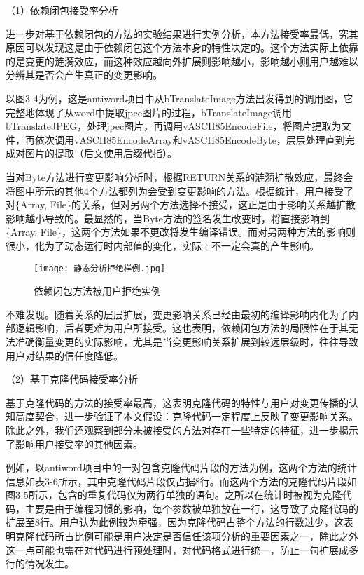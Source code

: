 （1）依赖闭包接受率分析

进一步对基于依赖闭包的方法的实验结果进行实例分析，本方法接受率最低，究其原因可以发现这是由于依赖闭包这个方法本身的特性决定的。这个方法实际上依靠的是变更的涟漪效应，而这种效应越向外扩展则影响越小，影响越小则用户越难以分辨其是否会产生真正的变更影响。

以图3-4为例，这是antiword项目中从bTranslateImage方法出发得到的调用图，它完整地体现了从word中提取jpec图片的过程，bTranslateImage调用bTranslateJPEG，处理jpec图片，再调用vASCII85EncodeFile，将图片提取为文件，再依次调用vASCII85EncodeArray和vASCII85EncodeByte，层层处理直到完成对图片的提取（后文使用后缀代指）。

当对Byte方法进行变更影响分析时，根据RETURN关系的涟漪扩散效应，最终会将图中所示的其他4个方法都列为会受到变更影响的方法。根据统计，用户接受了对\{Array, File\}的关系，但对另两个方法选择不接受，这正是由于影响关系越扩散影响越小导致的。最显然的，当Byte方法的签名发生改变时，将直接影响到\{Array, File\}，这两个方法如果不更改将发生编译错误。而对另两种方法的影响则很小，化为了动态运行时内部值的变化，实际上不一定会真的产生影响。

\clearpage

\begin{figure}[h]
\centering
\texttt{[image: 静态分析拒绝样例.jpg]}
\caption{依赖闭包方法被用户拒绝实例}
\end{figure}

不难发现。随着关系的层层扩展，变更影响关系已经由最初的编译影响内化为了内部逻辑影响，后者更难为用户所接受。这也表明，依赖闭包方法的局限性在于其无法准确衡量变更的实际影响，尤其是当变更影响关系扩展到较远层级时，往往导致用户对结果的信任度降低。



（2）基于克隆代码接受率分析

基于克隆代码的方法的接受率最高，这表明克隆代码的特性与用户对变更传播的认知高度契合，进一步验证了本文假设：克隆代码一定程度上反映了变更影响关系。除此之外，我们还观察到部分未被接受的方法对存在一些特定的特征，进一步揭示了影响用户接受率的其他因素。

例如，以antiword项目中的一对包含克隆代码片段的方法为例，这两个方法的统计信息如表3-6所示，其中克隆代码片段仅占据8行。而这两个方法的克隆代码片段如图3-5所示，包含的重复代码仅为两行单独的语句。之所以在统计时被视为克隆代码，主要是由于编程习惯的影响，每个参数被单独放在一行，这导致了克隆代码的扩展至8行。用户认为此例较为牵强，因为克隆代码占整个方法的行数过少，这表明克隆代码所占比例可能是用户决定是否信任该项分析的重要因素之一，除此之外这一点可能也需在对代码进行预处理时，对代码格式进行统一，防止一句扩展成多行的情况发生。

